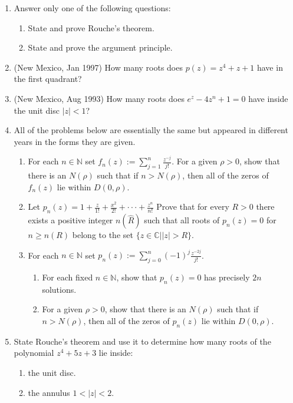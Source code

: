 \documentclass[a4paper,10pt]{article}
\begin{document}
\begin{enumerate}
	
	\item Answer only one of the following questions:
	\begin{enumerate}
		\item State and prove Rouche's theorem.
		\item State and prove the argument principle.
	\end{enumerate}
	
	\item (New Mexico, Jan 1997) How many roots does $p(z) = z^4 + z + 1$ have in the first quadrant?
	
	\item (New Mexico, Aug 1993)
	How many roots does $e^z - 4z^n +1 =0$ have inside the unit disc $\vert z \vert < 1$?
	
	  \item All of the problems below are essentially the same but appeared in different years in the forms they are given.
\begin{enumerate}
	\item For each $n\in\mathbb{N}$ set
	$f_{n}(z):=\sum_{j=1}^{n}\frac{z^{-j}}{j!}$. For a given $\rho>0$, show that there is an $N(\rho)$
	such that if $n>N(\rho)$, then all of the zeros of $f_{n}(z)$ lie within $D(0,\rho)$.
	\item Let $p_{n}(z)=1+\frac{z}{1!}+\frac{x^{2}}{2!}+\cdot\cdot\cdot+\frac{z^{n}}{n!}$ Prove that for every $R>0$ there exists a positive integer $n(\hat{R})$ such that all roots of $p_{n}(z)=0$ for $n\ge n(R)$ belong to the set $\{z\in\mathbb{C}||z|>R\}$.
	
	\item For each $n\in\mathbb{N}$ set $p_{n}(z):=\sum_{j=0}^{n}(-1)^{j}\frac{z^{-2j}}{j!}$.
	\begin{enumerate}
		\item For each fixed $n\in\mathbb{N}$, show that $p_{n}(z)=0$ has precisely $2n$ solutions.
		\item For a given $\rho>0$, show that there is an $N(\rho)$ such that if $n>N(\rho)$, then all of the zeros of $p_{n}(z)$ lie within $D(0,\rho)$.
	\end{enumerate}
\end{enumerate}
	
	\item State Rouche's theorem and use it to determine how many roots of the polynomial $z^{4}+5z+3$ lie inside:
	\begin{enumerate}
		\item the unit disc.
		\item the annulus $1<|z|<2$.
	\end{enumerate}
	

\end{enumerate}
\end{document}
